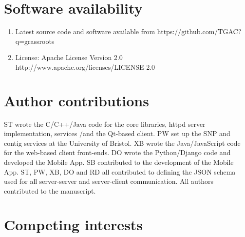 \documentclass[12pt,a4paper]{extarticle}
\begin{document}
\section*{Software availability}

\begin{enumerate}
\item Latest source code and software available from https://github.com/TGAC?q=grassroots
\item License: Apache License Version 2.0 http://www.apache.org/licenses/LICENSE-2.0
\end{enumerate}

\section*{Author contributions}
ST wrote the C/C++/Java code for the core libraries, httpd server implementation, services /and the Qt-based client.
PW set up the SNP and contig services at the University of Bristol.
XB wrote the Java/JavaScript code for the web-based client front-ends.
DO wrote the Python/Django code and developed the Mobile App.
SB contributed to the development of the Mobile App.
ST, PW, XB, DO and RD all contributed to defining the JSON schema used for all server-server and server-client communication.
All authors contributed to the manuscript.


\section*{Competing interests}
\end{document}
